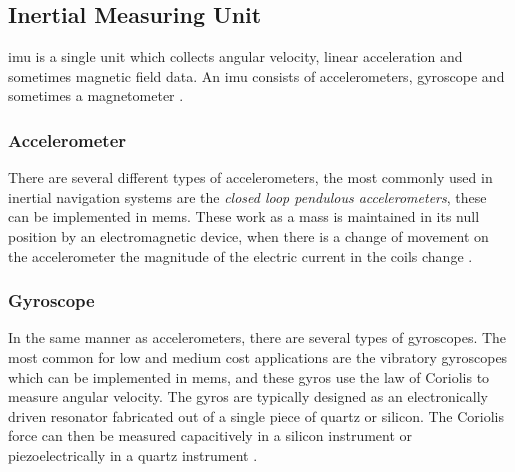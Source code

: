 \subsection{Inertial Measuring Unit}
\acrfull{imu} is a single unit which collects angular velocity, linear acceleration and sometimes magnetic field data. An \acrshort{imu} consists of accelerometers, gyroscope and sometimes a magnetometer \cite{vik}. 

\subsubsection{Accelerometer}
There are several different types of accelerometers, the most commonly used in inertial navigation systems are the \textit{closed loop pendulous accelerometers}, these can be implemented in \acrfull{mems}. These work as a mass is maintained in its null position by an electromagnetic device, when there is a change of movement on the accelerometer the magnitude of the electric current in the coils change \cite{vik}.

\subsubsection{Gyroscope}
In the same manner as accelerometers, there are several types of gyroscopes. The most common for low and medium cost applications are the vibratory gyroscopes which can be implemented in \acrshort{mems}, and these gyros use the law of Coriolis to measure angular velocity. The gyros are typically designed as an electronically driven resonator fabricated out of a single piece of quartz or silicon. The Coriolis force can then be measured capacitively in a silicon instrument or piezoelectrically in a quartz instrument \cite{vik}.
\newpage